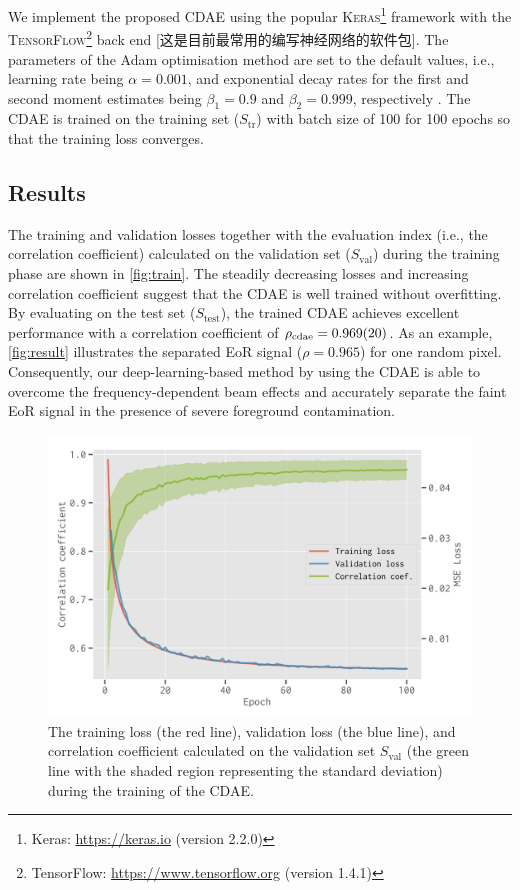 \documentclass[letters,a4paper,fleqn,usenatbib]{mnras}
\newcommand{\R}[1]{\mathrm{#1}}
\begin{document}
We implement the proposed CDAE using the popular \textsc{Keras}\footnote{%
  Keras: \url{https://keras.io} (version 2.2.0)}
framework \citep{keras} with the \textsc{TensorFlow}\footnote{%
TensorFlow: \url{https://www.tensorflow.org} (version 1.4.1)}
back end \citep{tensorflow} [这是目前最常用的编写神经网络的软件包].
The parameters of the Adam optimisation method are set to the default
values, i.e., learning rate being $\alpha = 0.001$, and
exponential decay rates for the first and second moment estimates being
$\beta_1 = 0.9$ and $\beta_2 = 0.999$, respectively \citep{kingma2015}.
The CDAE is trained on the training set ($S_{\R{tr}}$) with batch size
of 100 for 100 epochs so that the training loss converges.


\subsection{Results}
\label{sec:results}

The training and validation losses together with the evaluation index
(i.e., the correlation coefficient) calculated on the validation set
($S_{\R{val}}$) during the training phase are shown in \autoref{fig:train}.
The steadily decreasing losses and increasing correlation coefficient
suggest that the CDAE is well trained without overfitting.
By evaluating on the test set ($S_{\R{test}}$), the trained CDAE
achieves excellent performance with a correlation coefficient of
$\rho_{\R{cdae}} = \num{0.969 +- 0.020}$.
As an example, \autoref{fig:result} illustrates the separated EoR signal
($\rho = 0.965$) for one random pixel.
Consequently, our deep-learning-based method by using the CDAE is able
to overcome the frequency-dependent beam effects and accurately separate
the faint EoR signal in the presence of severe foreground contamination.

\begin{figure}
  \centering
  \includegraphics[width=\columnwidth]{cdae-train}
  \caption{\label{fig:train}%
    The training loss (the red line), validation loss (the blue line),
    and correlation coefficient calculated on the validation set
    $S_{\R{val}}$ (the green line with the shaded region representing
    the standard deviation) during the training of the CDAE.
  }
\end{figure}
\end{document}
